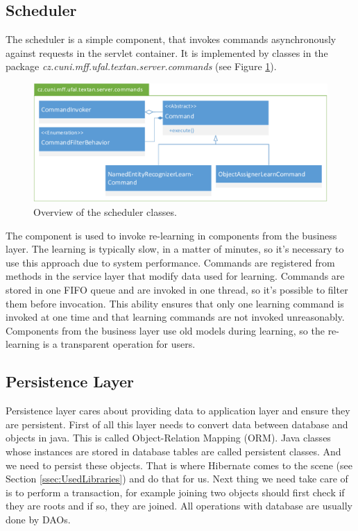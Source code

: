 \subsection{Scheduler}
The scheduler is a simple component, that invokes commands asynchronously against
requests in the servlet container. It is implemented by classes in the package
\emph{cz.\-cuni.\-mff.\-ufal.\-textan.\-server.\-commands} (see Figure
\ref{fig:CommandsOverview}).

\begin{figure}[!htb]
        \centering
        \includegraphics[width=\textwidth]{Images/Commands}
        \caption{Overview of the scheduler classes.}
        \label{fig:CommandsOverview}
\end{figure}

The component is used to invoke re-learning in components from the business layer.
The learning is typically slow, in a matter of minutes, so it's necessary to use
this approach due to system performance. Commands are registered from methods in
the service layer that modify data used for learning. Commands are stored in one
FIFO queue and are invoked in one thread, so it's possible to filter them before
invocation. This ability ensures that only one learning command is invoked at one
time and that learning commands are not invoked unreasonably. Components from
the business layer use old models during learning, so the re-learning is a transparent
operation for users.

\subsection{Persistence Layer}
\label{sec:PersistentLayer}


Persistence layer cares about providing data to application layer and ensure they
are persistent. First of all this layer needs to convert data between database and
objects in java. This is called Object-Relation Mapping (ORM). Java classes whose
instances are stored in database tables are called persistent classes. And we need
to persist these objects. That is where Hibernate comes to the scene (see Section
\ref{ssec:UsedLibraries}) and do that for us. Next thing we need take care of is
to perform a transaction, for example joining two objects should first check if
they are roots and if so, they are joined. All operations with database are usually
done by DAOs.

